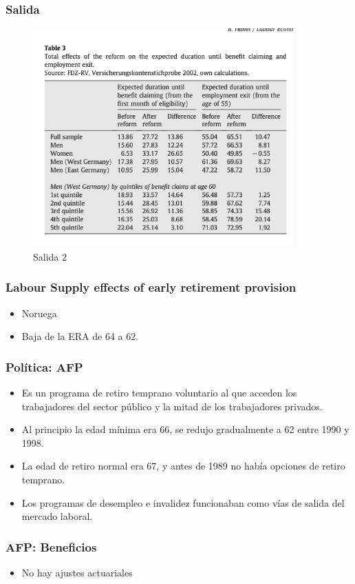 \documentclass{beamer}
\begin{document}
  {
    \frametitle{Salida}
      \begin{figure}[htp]
        \centering
        \includegraphics[width=10cm]{imgs/hanel10-tab3}
        \caption{Salida 2}
        \label{fig:fig2}
      \end{figure}
  }
  \frame
   {
     \frametitle{Labour Supply effects of early retirement provision}
     \begin{itemize}
     \item Noruega
     \item Baja de la ERA de 64 a 62. 
     \end{itemize}
   }

       \frame
           {
             \frametitle{Política: AFP}
             \begin{itemize}
             \item Es un programa de retiro temprano voluntario al que acceden los trabajadores del sector público y la mitad de los trabajadores privados.
             \item Al principio la edad mínima era 66, se redujo gradualmente a 62 entre 1990 y 1998.
             \item La edad de retiro normal era 67, y antes de 1989 no había opciones de retiro temprano.
             \item Los programas de desempleo e invalidez funcionaban como vías de salida del mercado laboral.

             \end{itemize}
           }
      \frame
           {
             \frametitle{AFP: Beneficios}
             \begin{itemize}
             \item No hay ajustes actuariales
             \end{itemize}
           }
           
\end{document}
